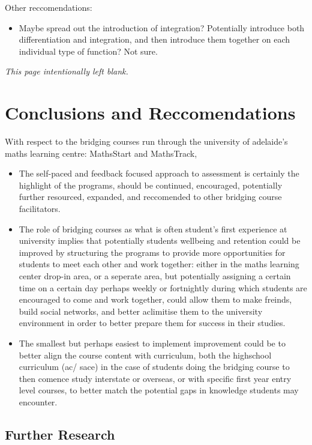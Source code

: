 \documentclass[twoside,12pt,a4paper]{report}
\makeatletter
\newcommand*{\intentionallyblankpage}{
  \vspace*{\fill}
  {\centering \textit{This page intentionally left blank.} \par}
  \vspace{\fill}}
\renewcommand*{\cleardoublepage}{\clearpage\if@twoside \ifodd\c@page\else
  \intentionallyblankpage
  \newpage
  \if@twocolumn\hbox{}\newpage\fi\fi\fi}
\makeatother
\begin{document}
Other reccomendations:
\begin{itemize}
	\item Maybe spread out the introduction of integration? Potentially introduce both differentiation and integration, and then introduce them together on each individual type of function? Not sure.
\end{itemize}





\cleardoublepage
\chapter{Conclusions and Reccomendations}
\label{chap:recommendations}

With respect to the bridging courses run through the university of adelaide's maths learning centre: MathsStart and MathsTrack,
\begin{itemize}
	\item The self-paced and feedback focused approach to assessment is certainly the highlight of the programs, should be continued, encouraged, potentially further resourced, expanded, and reccomended to other bridging course facilitators.
	\item The role of bridging courses as what is often student's first experience at university implies that potentially students wellbeing and retention could be improved by structuring the programs to provide more opportunities for students to meet each other and work together: either in the maths learning center drop-in area, or a seperate area, but potentially assigning a certain time on a certain day perhaps weekly or fortnightly during which students are encouraged to come and work together, could allow them to make freinds, build social networks, and better aclimitise them to the university environment in order to better prepare them for success in their studies.
	\item The smallest but perhaps easiest to implement improvement could be to better align the course content with curriculum, both the highschool curriculum (\gls{ac}/ \gls{sace}) in the case of students doing the bridging course to then comence study interstate or overseas, or with specific first year entry level courses, to better match the potential gaps in knowledge students may encounter.
\end{itemize}



\section{Further Research}
\end{document}
